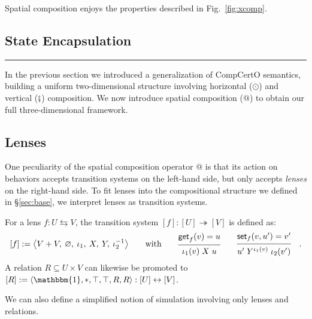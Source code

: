 \documentclass[acmsmall,screen,review,anonymous,nonacm]{acmart}
\newcommand{\kw}[1]{\ensuremath{ \mathsf{#1} }}
\newcommand{\lensarrow}{\leftrightarrows}
\newcommand{\vcomp}{\fatsemi}
\begin{document}
\begin{theorem}
Spatial composition
enjoys the properties described in Fig.~\ref{fig:xcomp}.
\end{theorem}



\subsection{State Encapsulation}



\vspace{1em}
\hrule

In the previous section
we introduced a generalization of CompCertO semantics,
building a uniform two-dimensional structure
involving horizontal ($\odot$) and vertical ($\vcomp$) composition.
We now introduce spatial composition ($\mathbin@$)
to obtain our full three-dimensional framework.

\subsection{Lenses} %

One peculiarity of the spatial composition operator $\mathbin@$
is that its action on behaviors
accepts transition systems on the left-hand side, but
only accepts \emph{lenses} on the right-hand side.
To fit lenses into the compositional structure
we defined in \S\ref{sec:base},
we interpret lenses as transition systems.

\begin{definition}
For a lens $f : U \lensarrow V$,
the transition system $[f] : [U] \twoheadrightarrow [V]$
is defined as:
\[
  [f] := \big\langle
    V + V, \: \varnothing, \:
    \iota_1, \: X, \: Y, \: \iota_2^{-1}
  \big\rangle
  \qquad \text{with} \qquad
  \begin{prooftree}
    \hypo{\kw{get}_f(v) = u}
    \infer1{\iota_1(v) \mathrel{X} u}
  \end{prooftree}
  \qquad
  \begin{prooftree}
    \hypo{\kw{set}_f(v, u') = v'}
    \infer1{u' \mathrel{Y^{\iota_1(v)}} \iota_2(v')}
  \end{prooftree}
  \quad.
\]
A relation $R \subseteq U \times V$
can likewise be promoted to
$[R] := \langle \mathbbm{1}, *, \top, \top, R, R \rangle :
 [U] \leftrightarrow [V]$.
\end{definition}

We can also define a simplified notion of simulation
involving only lenses and relations.
\end{document}
